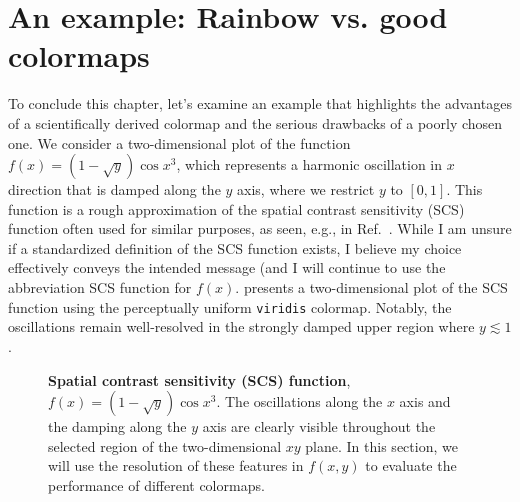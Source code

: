 \section{An example: Rainbow vs. good colormaps}\label{sec:rainbow}

To conclude this chapter, let's examine an example that highlights the advantages of a scientifically derived colormap and the serious drawbacks of a poorly chosen one. We consider a two-dimensional plot of the function $f(x)= \left(1 - \sqrt{y} \right)  \cos x^3$, which represents a harmonic oscillation in $x$ direction that is damped along the $y$ axis, where we restrict $y$ to $\left[0,1\right]$. This function is a rough approximation of the spatial contrast sensitivity (SCS) function often used for similar purposes, as seen, e.g., in Ref.~\cite{moreland2009}. While I am unsure if a standardized definition of the SCS function exists, I believe my choice effectively conveys the intended message (and I will continue to use the abbreviation SCS function for $f(x)$.
 presents a two-dimensional plot of the SCS function using the perceptually uniform \verb|viridis| colormap.
Notably, the oscillations remain well-resolved in the strongly damped upper region where $y \lesssim 1$.

\begin{figure}
\captionsetup{format = sidebyside, indention = 0cm} 
\begin{minipage}[t]{0.4\textwidth}
	\vspace{-5pt}
	\caption{\textbf{Spatial contrast sensitivity (SCS) function},  $f(x)= \left(1 - \sqrt{y} \right)  \cos x^3$. The oscillations along the $x$ axis and the damping along the $y$ axis are clearly visible throughout the selected region of the two-dimensional $xy$ plane. In this section, we will use the resolution of these features in $f(x,y)$ to evaluate the performance of different colormaps.}
	\label{fig:sensitivityfunction}
\end{minipage}\hfill 
\begin{minipage}[t]{0.55\textwidth}
	\centering 
	\vspace{0pt}
	
\end{minipage}
\end{figure} 


